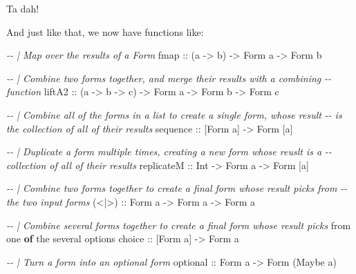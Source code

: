 \documentclass[]{article}
\newenvironment{Shaded}{}{}
\newcommand{\CommentTok}[1]{\textcolor[rgb]{0.38,0.63,0.69}{\textit{#1}}}
\newcommand{\DataTypeTok}[1]{\textcolor[rgb]{0.56,0.13,0.00}{#1}}
\newcommand{\FunctionTok}[1]{\textcolor[rgb]{0.02,0.16,0.49}{#1}}
\newcommand{\KeywordTok}[1]{\textcolor[rgb]{0.00,0.44,0.13}{\textbf{#1}}}
\newcommand{\NormalTok}[1]{#1}
\newcommand{\OtherTok}[1]{\textcolor[rgb]{0.00,0.44,0.13}{#1}}
\begin{document}
Ta dah!

And just like that, we now have functions like:

\begin{Shaded}
\begin{Highlighting}[]
\CommentTok{{-}{-} | Map over the results of a Form}
\FunctionTok{fmap}\OtherTok{   ::}\NormalTok{ (a }\OtherTok{{-}\textgreater{}}\NormalTok{ b) }\OtherTok{{-}\textgreater{}} \DataTypeTok{Form}\NormalTok{ a }\OtherTok{{-}\textgreater{}} \DataTypeTok{Form}\NormalTok{ b}

\CommentTok{{-}{-} | Combine two forms together, and merge their results with a combining}
\CommentTok{{-}{-} function}
\OtherTok{liftA2 ::}\NormalTok{ (a }\OtherTok{{-}\textgreater{}}\NormalTok{ b }\OtherTok{{-}\textgreater{}}\NormalTok{ c) }\OtherTok{{-}\textgreater{}} \DataTypeTok{Form}\NormalTok{ a }\OtherTok{{-}\textgreater{}} \DataTypeTok{Form}\NormalTok{ b }\OtherTok{{-}\textgreater{}} \DataTypeTok{Form}\NormalTok{ c}

\CommentTok{{-}{-} | Combine all of the forms in a list to create a single form, whose result}
\CommentTok{{-}{-} is the collection of all of their results}
\FunctionTok{sequence}\OtherTok{ ::}\NormalTok{ [}\DataTypeTok{Form}\NormalTok{ a] }\OtherTok{{-}\textgreater{}} \DataTypeTok{Form}\NormalTok{ [a]}

\CommentTok{{-}{-} | Duplicate a form multiple times, creating a new form whose reuslt is a}
\CommentTok{{-}{-} collection of all of their results}
\OtherTok{replicateM ::} \DataTypeTok{Int} \OtherTok{{-}\textgreater{}} \DataTypeTok{Form}\NormalTok{ a }\OtherTok{{-}\textgreater{}} \DataTypeTok{Form}\NormalTok{ [a]}

\CommentTok{{-}{-} | Combine two forms together to create a final form whose result picks from}
\CommentTok{{-}{-} the two input forms}
\OtherTok{(\textless{}|\textgreater{}) ::} \DataTypeTok{Form}\NormalTok{ a }\OtherTok{{-}\textgreater{}} \DataTypeTok{Form}\NormalTok{ a }\OtherTok{{-}\textgreater{}} \DataTypeTok{Form}\NormalTok{ a}

\CommentTok{{-}{-} | Combine several forms together to create a final form whose result picks}
\NormalTok{from one }\KeywordTok{of}\NormalTok{ the several options}
\OtherTok{choice ::}\NormalTok{ [}\DataTypeTok{Form}\NormalTok{ a] }\OtherTok{{-}\textgreater{}} \DataTypeTok{Form}\NormalTok{ a}

\CommentTok{{-}{-} | Turn a form into an optional form}
\OtherTok{optional ::} \DataTypeTok{Form}\NormalTok{ a }\OtherTok{{-}\textgreater{}} \DataTypeTok{Form}\NormalTok{ (}\DataTypeTok{Maybe}\NormalTok{ a)}
\end{Highlighting}
\end{Shaded}
\end{document}
